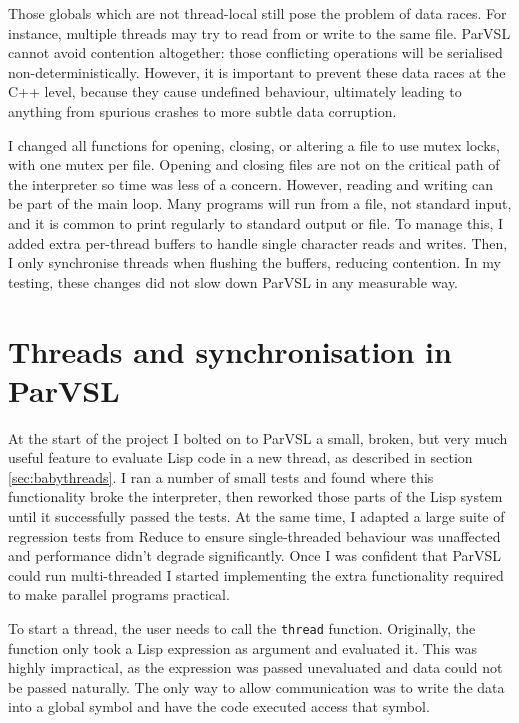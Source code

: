 Those globals which are not thread-local still pose the problem of data races. For instance, multiple threads
may try to read from or write to the same file. ParVSL cannot avoid contention altogether: those conflicting
operations will be serialised non-deterministically. However, it is important to prevent these data races at
the C++ level, because they cause undefined behaviour, ultimately leading to anything from spurious crashes
to more subtle data corruption.

I changed all functions for opening, closing, or altering a file to use mutex locks, with one mutex per file.
Opening and closing files are not on the critical path of the interpreter so time was less of a concern.
However, reading and writing can be part of the main loop. Many programs will run from a file, not standard input,
and it is common to print regularly to standard output or file. To manage this, I added extra per-thread buffers
to handle single character reads and writes. Then, I only synchronise threads when flushing the buffers, reducing
contention. In my testing, these changes did not slow down ParVSL in any measurable way.

\section{Threads and synchronisation in ParVSL}
\label{sec:threads}

At the start of the project I bolted on to ParVSL a small, broken, but very much useful feature to evaluate
Lisp code in a new thread, as described in section \ref{sec:babythreads}. I ran a number of small tests
and found where this functionality broke the interpreter, then reworked those parts of the Lisp system
until it successfully passed the tests. At the same time, I adapted a large suite of regression tests
from Reduce to ensure single-threaded behaviour was unaffected and performance didn't degrade significantly.
Once I was confident that ParVSL could run multi-threaded I started implementing the extra functionality
required to make parallel programs practical.

To start a thread, the user needs to call the \verb|thread| function.
Originally, the function only took a Lisp expression as argument and evaluated it. This was highly impractical,
as the expression was passed unevaluated and data could not be passed naturally. The only way to allow
communication was to write the data into a global symbol and have the code executed access that symbol.

